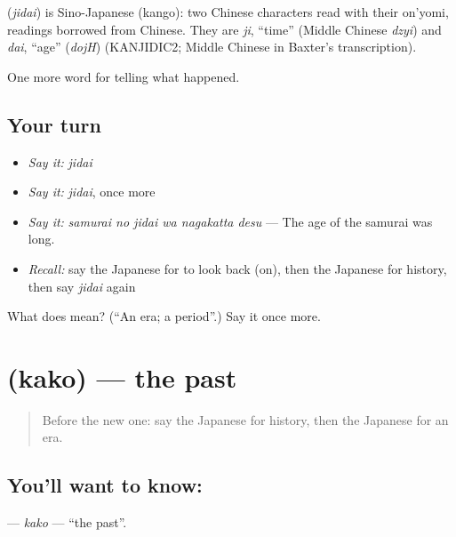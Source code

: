 \begin{cousinweb}
\textbf{} (\emph{jidai}) is Sino-Japanese (kango): two Chinese characters read with their on'yomi, readings borrowed from Chinese. They are \emph{ji}, \textquotedblleft{}time\textquotedblright{} (Middle Chinese \emph{dzyi}) and \emph{dai}, \textquotedblleft{}age\textquotedblright{} (\emph{dojH}) (KANJIDIC2; Middle Chinese in Baxter's transcription).
\end{cousinweb}

\begin{grammarlens}[title={What you've built}]
One more word for telling what happened.
\end{grammarlens}

\subsection*{Your turn}
\begin{itemize}
\raggedright
  \item \emph{Say it:} \emph{jidai}
  \item \emph{Say it:} \emph{jidai}, once more
  \item \emph{Say it:} \emph{samurai no jidai wa nagakatta desu} — The age of the samurai was long.
  \item \emph{Recall:} say the Japanese for to look back (on), then the Japanese for history, then say \emph{jidai} again
\end{itemize}

\begin{tcolorbox}[breakable,colback=teal!4,colframe=teal!35!black,title={Before you move on}]
What does  mean? (\textquotedblleft{}An era; a period\textquotedblright{}.) Say it once more.
\end{tcolorbox}
\section[\texorpdfstring{\ja{かこ} (kako)}{かこ (kako)}]{ (kako) — the past}

\label{lesson:JA-C312-kako}



\begin{quote}
Before the new one: say the Japanese for history, then the Japanese for an era.
\end{quote}

\subsection*{You'll want to know: }
\textbf{} — \emph{kako} — \textquotedblleft{}the past\textquotedblright{}.

